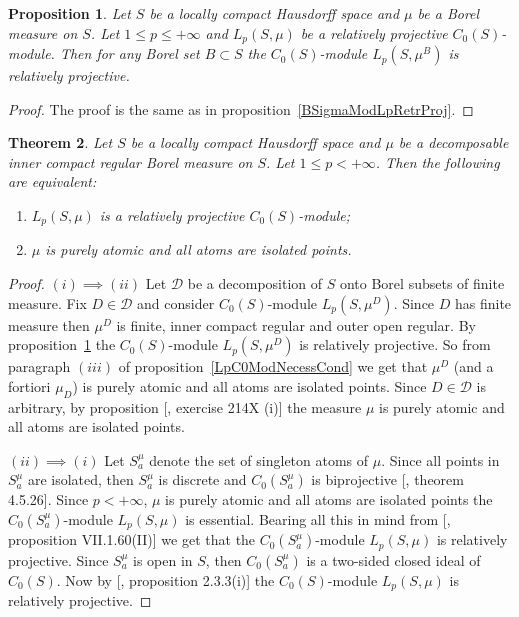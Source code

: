\documentclass[12pt]{article}
\newtheorem{theorem}{Theorem}[section]
\newtheorem{proposition}[theorem]{Proposition}
\begin{document}
\begin{proposition}\label{C0ModLpRetrProj} Let $S$ be a locally compact
    Hausdorff space and $\mu$ be a Borel measure on $S$. Let $1\leq p\leq
        +\infty$ and $L_p(S,\mu)$ be a relatively projective $C_0(S)$-module. Then
    for any Borel set $B\subset S$ the $C_0(S)$-module $L_p(S,\mu^B)$ is
    relatively projective.
\end{proposition}
\begin{proof} The proof is the same as in proposition~\ref{BSigmaModLpRetrProj}.
\end{proof}

\begin{theorem}\label{ReflLpC0ModCrit} Let $S$ be a locally compact Hausdorff
    space and $\mu$ be a decomposable inner compact regular Borel measure on
    $S$. Let $1\leq p< +\infty$. Then the following are equivalent:
    \begin{enumerate}[label = (\roman*)]
        \item $L_p(S,\mu)$ is a relatively projective $C_0(S)$-module;
        \item $\mu$ is purely atomic and all atoms are isolated points.
    \end{enumerate}
\end{theorem}
\begin{proof} $(i)\implies (ii)$ Let $\mathcal{D}$ be a decomposition of $S$
    onto Borel subsets of finite measure. Fix $D\in\mathcal{D}$ and consider
    $C_0(S)$-module $L_p(S,\mu^D)$. Since $D$ has finite measure then $\mu^D$ is
    finite, inner compact regular and outer open regular. By
    proposition~\ref{C0ModLpRetrProj} the $C_0(S)$-module $L_p(S,\mu^D)$ is
    relatively projective. So from paragraph $(iii)$ of
    proposition~\ref{LpC0ModNecessCond} we get that $\mu^D$ (and a fortiori
    $\mu_D$) is purely atomic and all atoms are isolated points. Since
    $D\in\mathcal{D}$ is arbitrary, by proposition [\cite{FremMeasTh2}, exercise
            214X (i)] the measure $\mu$ is purely atomic and all atoms are isolated
    points.

    $(ii)\implies (i)$ Let $S_a^\mu$ denote the set of singleton atoms of $\mu$.
    Since all points in $S_a^\mu$ are isolated, then $S_a^\mu$ is discrete and
    $C_0(S_a^\mu)$ is biprojective [\cite{HelHomolBanTopAlg}, theorem 4.5.26].
    Since $p<+\infty$, $\mu$ is purely atomic and all atoms are isolated points
    the $C_0(S_a^\mu)$-module $L_p(S,\mu)$ is  essential. Bearing all this in
    mind from [\cite{HelBanLocConvAlg}, proposition VII.1.60(II)] we get that
    the $C_0(S_a^\mu)$-module $L_p(S,\mu)$ is relatively projective. Since
    $S_a^\mu$ is open in $S$, then $C_0(S_a^\mu)$ is a two-sided closed ideal of
    $C_0(S)$. Now by [\cite{RamsHomPropSemgroupAlg}, proposition 2.3.3(i)] the
    $C_0(S)$-module $L_p(S,\mu)$ is relatively projective.
\end{proof}
\end{document}
